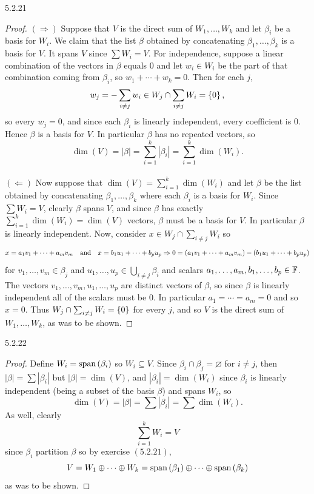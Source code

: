 \documentclass{exam}
\begin{document}
  \begin{problem}{5.2.21}
    \begin{proof}
      $(\Rightarrow)$ Suppose that $V$ is the direct sum of $W_1, \dots, W_k$ and let $\beta_i$ be a basis for $W_i$. We claim that the list $\beta$ obtained by concatenating $\beta_1, \dots, \beta_k$ is a basis for $V$. It spans $V$ since $\sum W_i = V$. For independence, suppose a linear combination of the vectors in $\beta$ equals $0$ and let $w_i \in W_i$ be the part of that combination coming from $\beta_i$, so $w_1 + \cdots + w_k = 0$. Then for each $j$,
      \[
        w_j = -\sum_{i \neq j} w_i \in W_j \cap \sum_{i \neq j} W_i = \left\{0 \right\},
      \]
      so every $w_j = 0$, and since each $\beta_i$ is linearly independent, every coefficient is $0$. Hence $\beta$ is a basis for $V$. In particular $\beta$ has no repeated vectors, so
      \[
        \dim(V) = |\beta| = \sum_{i=1}^{k} |\beta_i| = \sum_{i=1}^{k} \dim(W_i).
      \] \\
      $(\Leftarrow)$ Now suppose that $\dim(V) = \sum_{i=1}^{k} \dim(W_i)$ and let $\beta$ be the list obtained by concatenating $\beta_1, \dots, \beta_k$ where each $\beta_i$ is a basis for $W_i$. Since $\sum W_i = V$, clearly $\beta$ spans $V$, and since $\beta$ has exactly $\sum_{i=1}^{k} \dim(W_i) = \dim(V)$ vectors, $\beta$ must be a basis for $V$. In particular $\beta$ is linearly independent. Now, consider $x \in W_j \cap \sum_{i \neq j} W_i$ so
      \[
        x = a_1 v_1 + \cdots + a_m v_m \quad\text{and}\quad x = b_1 u_1 + \cdots + b_p u_p
        \Rightarrow 0 = (a_1 v_1 + \cdots + a_m v_m) - (b_1 u_1 + \cdots + b_p u_p)
      \]
      for $v_1, \dots, v_m \in \beta_j$ and $u_1, \dots, u_p \in \bigcup_{i \neq j} \beta_i$ and scalars $a_1, \dots, a_m, b_1, \dots, b_p \in \mathbb F$. The vectors $v_1, \dots, v_m, u_1, \dots, u_p$ are distinct vectors of $\beta$, so since $\beta$ is linearly independent all of the scalars must be $0$. In particular $a_1 = \cdots = a_m = 0$ and so $x = 0$. Thus $W_j \cap \sum_{i \neq j} W_i = \left\{0 \right\}$ for every $j$, and so $V$ is the direct sum of $W_1, \dots, W_k$, as was to be shown.
    \end{proof}
  \end{problem}

  \begin{problem}{5.2.22}
    \begin{proof}
      Define $W_i = \text{span}\left({\beta_i}\right)$ so $W_i \subseteq V$. Since $\beta_i \cap \beta_j = \varnothing$ for $i \neq j$, then $|\beta| = \sum|\beta_i|$ but $|\beta| = \dim(V)$, and $|\beta_i| = \dim(W_i)$ since $\beta_i$ is linearly independent (being a subset of the basis $\beta$) and spans $W_i$, so 
      \[
        \dim(V) = |\beta| = \sum|\beta_i| = \sum\dim(W_i).
      \]
      As well, clearly 
      \[
        \sum_{i = 1}^{k} W_i = V
      \]
      since $\beta_i$ partition $\beta$ so by exercise $(5.2.21)$, 
      \[
        V = W_1 \oplus \cdots \oplus W_k = \text{span}\left({\beta_1}\right) \oplus \cdots \oplus \text{span}\left({\beta_k}\right)
      \]
      as was to be shown.
    \end{proof}
  \end{problem}
\end{document}
